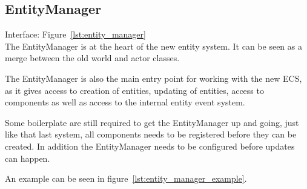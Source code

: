 \subsection{EntityManager}
Interface: Figure~\ref{lst:entity_manager}\\\noindent
The EntityManager is at the heart of the new entity system.
It can be seen as a merge between the old world and actor classes.

The EntityManager is also the main entry point for working with the new ECS,
as it gives access to creation of entities, updating of entities, access to components as well as access to the internal entity event system.

Some boilerplate are still required to get the EntityManager up and going, 
just like that last system, all components needs to be registered before they can be created.
In addition the EntityManager needs to be configured before updates can happen.

An example can be seen in figure~\ref{lst:entity_manager_example}.\\
